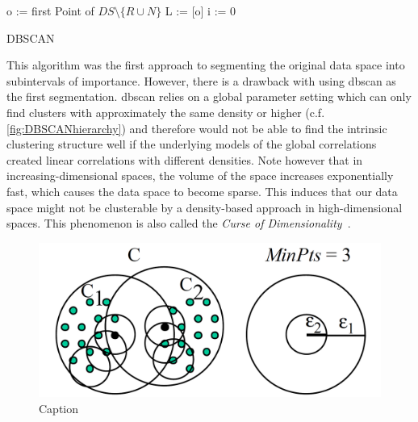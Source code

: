 \vspace{5mm}
\begin{algorithm}[H]
\SetAlgoLined
{}
 o := first Point of $DS\setminus \{R \cup N\}$\;
 L := [o]\;
 i := 0\;
 \caption{DBSCAN}
\end{algorithm}
\vspace{5mm}

This algorithm was the first approach to segmenting the original data space into subintervals of importance. However, there is a drawback with using \gls{dbscan} as the first segmentation. \gls{dbscan} relies on a global parameter setting which can only find clusters with approximately the same density or higher (c.f. \autoref{fig:DBSCANhierarchy}) and therefore would not be able to find the intrinsic clustering structure well if the underlying models of the global correlations created linear correlations with different densities. 
Note however that in increasing-dimensional spaces, the volume of the space increases exponentially fast, which causes the data space to become sparse. This induces that our data space might not be clusterable by a density-based approach in high-dimensional spaces. This phenomenon is also called the \textit{Curse of Dimensionality}~\cite{bellman2015adaptive}.

\begin{figure}
    \centering
    \includegraphics[width=.5\textwidth]{figures/DBSCANleastdensity.png}
    \caption{Caption ~\cite{opticsankerst1999optics}}
    \label{fig:DBSCANhierarchy}
\end{figure}


